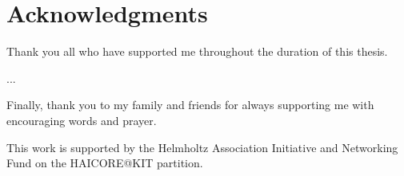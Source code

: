 \chapter*{Acknowledgments}
\label{Acknowledgments}

Thank you all who have supported me throughout the duration of this thesis. 

...

Finally, thank you to my family and friends for always supporting me with encouraging words and prayer.


This work is supported by the Helmholtz Association Initiative and Networking Fund on the HAICORE@KIT partition.
